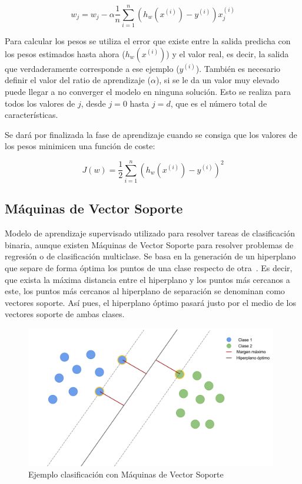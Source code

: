 \documentclass[a4paper, 12pt]{book}
\begin{document}
\begin{equation}
    w_j = w_j - \alpha \frac{1}{n} \sum_{i= 1}^{n} (h_w(x^{(i)}) - y^{(i)}) x_j^{(i)}
    \label{eq:desc_gradiente}
\end{equation}

Para calcular los pesos se utiliza el error que existe entre la salida predicha con los pesos estimados hasta ahora ($h_w(x^{(i)})$) y el valor real, es decir, la salida que verdaderamente corresponde a ese ejemplo ($y^{(i)}$). También es necesario definir el valor del ratio de aprendizaje ($\alpha$), si se le da un valor muy elevado puede llegar a no converger el modelo en ninguna solución. Esto se realiza para todos los valores de $j$, desde $j= 0$ hasta $j= d$, que es el número total de características.

Se dará por finalizada la fase de aprendizaje cuando se consiga que los valores de los pesos minimicen una función de coste:

\begin{equation}
    J(w) = \frac{1}{2} \sum_{i= 1}^{n} {(h_w(x^{(i)}) - y^{(i)})}^2 
\end{equation}


\subsection{Máquinas de Vector Soporte}
\label{subsec:maquinas_vector_soporte}

Modelo de aprendizaje supervisado utilizado para resolver tareas de clasificación binaria, aunque existen Máquinas de Vector Soporte para resolver problemas de regresión o de clasificación multiclase. Se basa en la generación de un hiperplano que separe de forma óptima los puntos de una clase respecto de otra~\cite{Duda2001}. Es decir, que exista la máxima distancia entre el hiperplano y los puntos más cercanos a este, los puntos más cercanos al hiperplano de separación se denominan como vectores soporte. Así pues, el hiperplano óptimo pasará justo por el medio de los vectores soporte de ambas clases.

\begin{figure}[htb]
  \centering
  \includegraphics[width=11cm, keepaspectratio]{img/explicacion_SVM.pdf}
  \caption{Ejemplo clasificación con Máquinas de Vector Soporte}\label{fig:explicacion_svm}
\end{figure}
\end{document}
